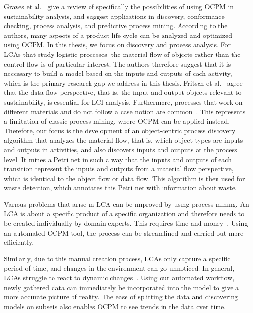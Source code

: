 Graves et al.~\autocite{graves2023} give a review of specifically the possibilities of using OCPM in sustainability analysis, and suggest applications in discovery, conformance checking, process analysis, and predictive process mining.
According to the authors, many aspects of a product life cycle can be analyzed and optimized using OCPM.
In this thesis, we focus on discovery and process analysis.
For LCAs that study logistic processes, the material flow of objects rather than the control flow is of particular interest.
The authors therefore suggest that it is necessary to build a model based on the inputs and outputs of each activity, which is the primary research gap we address in this thesis.
Fritsch et al.~\autocite{fritsch2022} agree that the data flow perspective, that is, the input and output objects relevant to sustainability, is essential for LCI analysis.
Furthermore, processes that work on different materials and do not follow a case notion are common~\autocite{fritsch2022}.
This represents a limitation of classic process mining, where OCPM can be applied instead.
Therefore, our focus is the development of an object-centric process discovery algorithm that analyzes the material flow, that is, which object types are inputs and outputs in activities, and also discovers inputs and outputs at the process level.
It mines a Petri net in such a way that the inputs and outputs of each transition represent the inputs and outputs from a material flow perspective, which is identical to the object flow or data flow.
This algorithm is then used for waste detection, which annotates this Petri net with information about waste.



Various problems that arise in LCA can be improved by using process mining.
An LCA is about a specific product of a specific organization and therefore needs to be created individually by domain experts.
    This requires time and money~\autocite{brunner2017}.
    Using an automated OCPM tool, the process can be streamlined and carried out more efficiently.

    Similarly, due to this manual creation process, LCAs only capture a specific period of time, and changes in the environment can go unnoticed.
    In general, LCAs struggle to react to dynamic changes~\autocite{levasseur2010}.
    Using our automated workflow, newly gathered data can immediately be incorporated into the model to give a more accurate picture of reality.
    The ease of splitting the data and discovering models on subsets also enables OCPM to see trends in the data over time.


